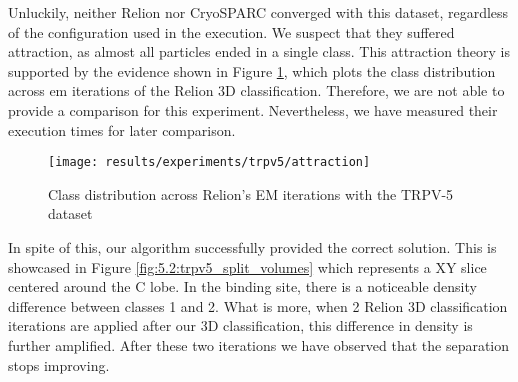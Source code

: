 \documentclass[../main.tex]{subfiles}
\begin{document}
Unluckily, neither Relion nor CryoSPARC converged with this dataset, regardless of the configuration used in the execution. We suspect that they suffered attraction, as almost all particles ended in a single class. This attraction theory is supported by the evidence shown in Figure \ref{fig:5.2:trpv_attraction}, which plots the class distribution across \gls{em} iterations of the Relion 3D classification. Therefore, we are not able to provide a comparison for this experiment. Nevertheless, we have measured their execution times for later comparison. 

\begin{figure}[hbp]
    \centering
    \texttt{[image: results/experiments/trpv5/attraction]}
    \caption{Class distribution across Relion's EM iterations with the TRPV-5 dataset}
    \label{fig:5.2:trpv_attraction}
\end{figure}

In spite of this, our algorithm successfully provided the correct solution. This is showcased in Figure \ref{fig:5.2:trpv5_split_volumes} which represents a XY slice centered around the C lobe. In the binding site, there is a noticeable density difference between classes 1 and 2. What is more, when 2 Relion 3D classification iterations are applied after our 3D classification, this difference in density is further amplified. After these two iterations we have observed that the separation stops improving. 
\end{document}
